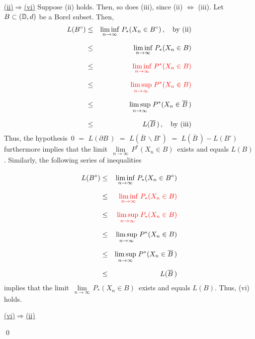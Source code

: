 \vskip 0.5cm \noindent
\underline{(ii)\;$\Longrightarrow$\;(vi)}
\vskip 0.2cm \noindent
Suppose (ii) holds. Then, so does (iii), since (ii) $\Longleftrightarrow$ (iii).
Let $B \subset (\mathbb{D},d)$ be a Borel subset. Then,
\begin{eqnarray*}
L(B^{\circ})
& \leq &
	\underset{n\rightarrow\infty}{\liminf}\; P_{*}(X_{n} \in B^{\circ})\,,
	\quad\textnormal{by (ii)}
\\
& \overset{{\color{white}\vert}}{\leq} &
	\underset{n\rightarrow\infty}{\liminf}\; P_{*}(X_{n} \in B)
\\
& \overset{{\color{white}\vert}}{\leq} &
	{\color{red}\underset{n\rightarrow\infty}{\liminf}\; P^{*}(X_{n} \in B)}
\\
& \overset{{\color{white}\vert}}{\leq} &
	{\color{red}\underset{n\rightarrow\infty}{\limsup}\; P^{*}(X_{n} \in B)}
\\
& \overset{{\color{white}\vert}}{\leq} &
	\underset{n\rightarrow\infty}{\limsup}\; P^{*}(X_{n} \in \overline{B}\,)
\\
& \overset{{\color{white}\vert}}{\leq} &
	L(\overline{B}\,)\,,
	\quad\textnormal{by (iii)}
\end{eqnarray*}
Thus, the hypothesis
\,$0$ $=$ $L(\partial B\,)$ $=$ $L(\overline{B}\,\backslash B^{\circ})$
$=$ $L(\overline{B}\,) - L(B^{\circ})$\,
furthermore implies that the limit
\,$\underset{n\rightarrow\infty}{\lim}\, P^{*}(X_{n} \in B)$\,
exists and equals $L(B)$.
Similarly, the following series of inequalities
\begin{eqnarray*}
L(B^{\circ})
& \overset{{\color{white}\vert}}{\leq} &
	\underset{n\rightarrow\infty}{\liminf}\; P_{*}(X_{n} \in B^{\circ})
\\
& \overset{{\color{white}\vert}}{\leq} &
	{\color{red}\underset{n\rightarrow\infty}{\liminf}\; P_{*}(X_{n} \in B)}
\\
& \overset{{\color{white}\vert}}{\leq} &
	{\color{red}\underset{n\rightarrow\infty}{\limsup}\; P_{*}(X_{n} \in B)}
\\
& \overset{{\color{white}\vert}}{\leq} &
	\underset{n\rightarrow\infty}{\limsup}\; P^{*}(X_{n} \in B)
\\
& \overset{{\color{white}\vert}}{\leq} &
	\underset{n\rightarrow\infty}{\limsup}\; P^{*}(X_{n} \in \overline{B}\,)
\\
& \overset{{\color{white}\vert}}{\leq} &
	L(\overline{B}\,)
\end{eqnarray*}
implies that the limit
\,$\underset{n\rightarrow\infty}{\lim}\, P_{*}(X_{n} \in B)$\,
exists and equals $L(B)$.
Thus, (vi) holds.

\vskip 0.5cm \noindent
\underline{(vi)\;$\Longrightarrow$\;(ii)}
\vskip 0.2cm \noindent

\qed



\renewcommand{\theenumi}{\roman{enumi}}
\renewcommand{\labelenumi}{\textnormal{(\theenumi)}$\;\;$}

